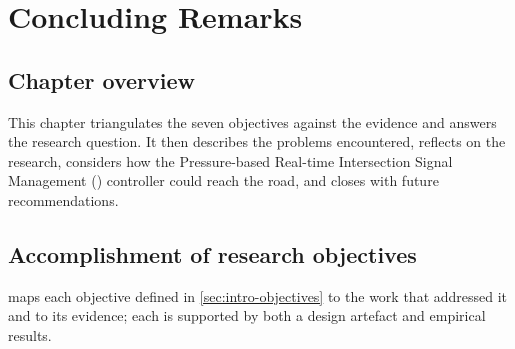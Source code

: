\chapter{Concluding Remarks}\label{ch:conc}

\section{Chapter overview}

This chapter triangulates the seven objectives against the evidence and answers the research question. It then describes the problems encountered, reflects on the research, considers how the Pressure-based Real-time Intersection Signal Management (\prism{}) controller could reach the road, and closes with future recommendations.

\section{Accomplishment of research objectives}\label{sec:conc-objectives}

 maps each objective defined in \cref{sec:intro-objectives} to the work that addressed it and to its evidence; each is supported by both a design artefact and empirical results.

